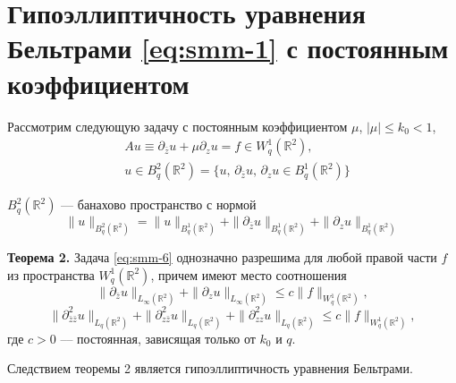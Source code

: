 \section{Гипоэллиптичность уравнения Бельтрами \eqref{eq:smm-1} с постоянным коэффициентом}
Рассмотрим следующую задачу с постоянным коэффициентом  $\mu$, $|\mu|\leqslant k_0<1$,
\begin{equation}\label{eq:smm-6}
\begin{split}
	&Au\equiv\partial_{\bar{z}}u+\mu\partial_z u=f\in W^1_q (\mathbb{R}^2),\\
	&u\in B_q^2(\mathbb{R}^2) =\{u,\,\partial_{\bar{z}}u,\,\partial_z u\in 
	B_q^1(\mathbb{R}^2)\}
\end{split} 
\end{equation}

$B_q^2(\mathbb{R}^2)$ --- банахово пространство с нормой
$$
\|u\|_{B_q^2(\mathbb{R}^2)}=\|u\|_{B_q^1(\mathbb{R}^2)}+\|\partial_{\bar{z}}u\|_{B_q^1(\mathbb{R}^2)}+\|\partial_{z}u\|_{B_q^1(\mathbb{R}^2)}
$$

\textbf{Теорема 2.} Задача \eqref{eq:smm-6} однозначно разрешима для любой правой части $f$ из пространства $W_q^1 (\mathbb{R}^2)$, причем имеют место соотношения
$$
\|\partial_{\bar{z}}u\|_{L_\infty(\mathbb{R}^2)}+\|\partial_{z}u\|_{L_\infty(\mathbb{R}^2)}
\leqslant c\|f\|_{W^1_q (\mathbb{R}^2)}, %
$$
$$
\|\partial^2_{\bar{z}\bar{z}}u\|_{L_q(\mathbb{R}^2)}+\|\partial^2_{z\bar{z}}u\|_{L_q(\mathbb{R}^2)}+\|\partial^2_{zz}u\|_{L_q(\mathbb{R}^2)}
\leqslant c\|f\|_{W^1_q (\mathbb{R}^2)}, %
$$
где $c >0$ –-- постоянная, зависящая только от $k_0$ и $q$.

Следствием теоремы 2 является гипоэллиптичность уравнения Бельтрами.


